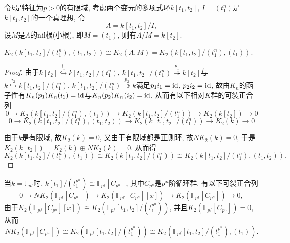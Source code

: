 令$k$是特征为$p>0$的有限域, 考虑两个变元的多项式环$k[t_1, t_2]$, $I=(t_1^n)$是$k[t_1, t_2]$的一个真理想,
令
\[A=k[t_1, t_2]/I, \]
设$M$是$A$的nil根(小根), 即$M=(t_1)$, 则有$A/M=k[t_2]$. 
\begin{prop}
	$K_2(k[t_1, t_2]/(t_1^n), (t_1, t_2))\cong K_2(A, M)=K_2(k[t_1, t_2]/(t_1^n), (t_1))$. 
\end{prop}
\begin{proof}
	由于$k[t_2]\overset{i_1}\hookrightarrow k[t_1,t_2]/(t_1^n)$, $k[t_1,t_2]/(t_1^n)\overset{p_1}\twoheadrightarrow k[t_2]$与$k\overset{i_2}\hookrightarrow k[t_1,t_2]/(t_1^n)$, $k[t_1,t_2]/(t_1^n)\overset{p_2}\twoheadrightarrow k$满足$p_1i_1=\mathrm{id}$, $p_2i_2=\mathrm{id}$, 故由$K_n$的函子性有$K_n(p_1)K_n(i_1)=\mathrm{id}$与$K_n(p_2)K_n(i_2)=\mathrm{id}$, 从而有以下相对$K$群的可裂正合列
	\[
	0\longrightarrow K_2(k[t_1, t_2]/(t_1^n), (t_1)) \longrightarrow K_2(k[t_1, t_2]/(t_1^n)) \longrightarrow K_2(k[t_2]) \longrightarrow 0
	\]
	\[
	0\longrightarrow K_2(k[t_1, t_2]/(t_1^n), (t_1, t_2)) \longrightarrow K_2(k[t_1, t_2]/(t_1^n)) \longrightarrow K_2(k) \longrightarrow 0
	\]

	由于$k$是有限域, 故$K_2(k)=0$, 又由于有限域都是正则环, 故$NK_2(k)=0$, 于是$K_2(k[t_2])=K_2(k)\oplus NK_2(k)=0$. 从而得
	\[K_2(k[t_1, t_2]/(t_1^n), (t_1))\cong K_2(k[t_1, t_2]/(t_1^n)) \cong K_2(k[t_1, t_2]/(t_1^n), (t_1, t_2)). \]
\end{proof}

当$k=\mathbb{F}_{p^f}$时, $k[t_1]/(t_1^{p^n})\cong \mathbb{F}_{p^f}[C_{p^n}]$, 其中$C_{p^n}$是$p^n$阶循环群. 有以下可裂正合列
\[0\longrightarrow NK_2(\mathbb{F}_{p^f}[C_{p^n}]) \longrightarrow K_2(\mathbb{F}_{p^f}[C_{p^n}][x])\longrightarrow K_2(\mathbb{F}_{p^f}[C_{p^n}]) \longrightarrow 0, \]
由于$K_2(\mathbb{F}_{p^f}[C_{p^n}][x])\cong K_2(\mathbb{F}_{p^f}[t_1, t_2]/(t_1^{p^n}))$, 并且$K_2(\mathbb{F}_{p^f}[C_{p^n}])=0$\cite{MORRIS198091}, 从而
\[NK_2(\mathbb{F}_{p^f}[C_{p^n}])\cong K_2(\mathbb{F}_{p^f}[t_1, t_2]/(t_1^{p^n})) \cong K_2(\mathbb{F}_{p^f}[t_1, t_2]/(t_1^{p^n}), (t_1)). \]



